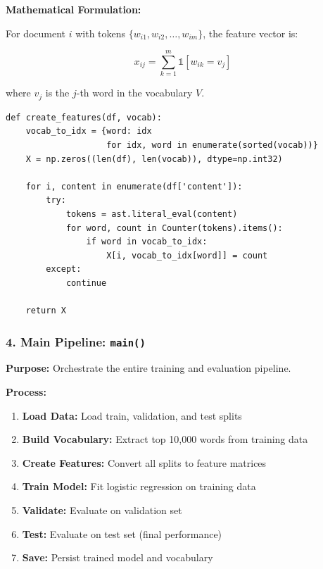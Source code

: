 \documentclass[11pt,a4paper]{article}
\begin{document}
\textbf{Mathematical Formulation:}

For document $i$ with tokens $\{w_{i1}, w_{i2}, \ldots, w_{im}\}$, the feature vector is:

\begin{equation}
x_{ij} = \sum_{k=1}^{m} \mathbb{1}[w_{ik} = v_j]
\end{equation}

where $v_j$ is the $j$-th word in the vocabulary $V$.

\begin{lstlisting}[style=pythonstyle, caption={Feature Creation Function}]
def create_features(df, vocab):
    vocab_to_idx = {word: idx 
                    for idx, word in enumerate(sorted(vocab))}
    X = np.zeros((len(df), len(vocab)), dtype=np.int32)
    
    for i, content in enumerate(df['content']):
        try:
            tokens = ast.literal_eval(content)
            for word, count in Counter(tokens).items():
                if word in vocab_to_idx:
                    X[i, vocab_to_idx[word]] = count
        except:
            continue
    
    return X
\end{lstlisting}

\subsubsection{4. Main Pipeline: \texttt{main()}}

\textbf{Purpose:} Orchestrate the entire training and evaluation pipeline.

\textbf{Process:}
\begin{enumerate}
    \item \textbf{Load Data:} Load train, validation, and test splits
    \item \textbf{Build Vocabulary:} Extract top 10,000 words from training data
    \item \textbf{Create Features:} Convert all splits to feature matrices
    \item \textbf{Train Model:} Fit logistic regression on training data
    \item \textbf{Validate:} Evaluate on validation set
    \item \textbf{Test:} Evaluate on test set (final performance)
    \item \textbf{Save:} Persist trained model and vocabulary
\end{enumerate}
\end{document}
